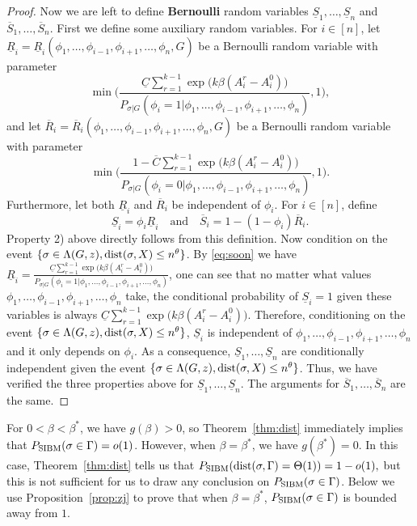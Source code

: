 \documentclass{article}
\begin{document}
\begin{proof}
	Now we are left to define {\bf Bernoulli} random variables $\underline{S}_1,\dots, \underline{S}_n$ and $\overline{S}_1,\dots,\overline{S}_n$.
	First we define some auxiliary random variables.
	For $i\in[n]$, let 
	$\underline{R}_i=\underline{R}_i(\phi_1,\dots,\phi_{i-1},\phi_{i+1},\dots,\phi_n,G)$ be a Bernoulli random variable with parameter 
	$$
	\min \Big( \frac{\underline{C}
		\sum_{r=1}^{k-1}\exp\big(k\beta (A^r_i-A^0_i) \big)}{P_{\sigma|G}(\phi_i=1|\phi_1,\dots,\phi_{i-1},\phi_{i+1},\dots,\phi_n)} , 1 \Big) ,
	$$
	and let 
	$\overline{R}_i=\overline{R}_i(\phi_1,\dots,\phi_{i-1},\phi_{i+1},\dots,\phi_n,G)$ be a Bernoulli random variable with parameter 
	$$
	\min \Big(\frac{1- \overline{C}
		\sum_{r=1}^{k-1}\exp\big(k\beta (A^r_i-A^0_i) \big)}{P_{\sigma|G}(\phi_i=0|\phi_1,\dots,\phi_{i-1},\phi_{i+1},\dots,\phi_n)} , 1 \Big) .
	$$
	Furthermore, let both $\underline{R}_i$ and $\overline{R}_i$ be independent of $\phi_i$.
	For $i\in[n]$, define
	$$
	\underline{S}_i=\phi_i \underline{R}_i \quad
	\text{and} \quad
	\overline{S}_i = 1- (1-\phi_i) \overline{R}_i .
	$$
	Property 2) above directly follows from this definition.
	Now condition on the event $\{\sigma\in \Lambda(G,z) ,\operatorname{dist}(\sigma, X) \le n^{\theta}\}$.
	By \eqref{eq:soon} we have $\underline{R}_i =\frac{\underline{C}
		\sum_{r=1}^{k-1}\exp\big(k\beta (A^r_i-A^0_i) \big)}{P_{\sigma|G}(\phi_i=1|\phi_1,\dots,\phi_{i-1},\phi_{i+1},\dots,\phi_n)} $, one can see that no matter what values $\phi_1,\dots,\phi_{i-1},\phi_{i+1},\dots,\phi_n$ take, the conditional probability of $\underline{S}_i=1$ given these variables is always $\underline{C}
	\sum_{r=1}^{k-1}\exp\big(k\beta (A^r_i-A^0_i) \big)$. Therefore, conditioning on the event $\{\sigma\in \Lambda(G,z) ,\operatorname{dist}(\sigma, X) \le n^{\theta}\}$, $\underline{S}_i$ is independent of $\phi_1,\dots,\phi_{i-1},\phi_{i+1},\dots,\phi_n$ and it only depends on $\phi_i$. As a consequence, $\underline{S}_1,\dots, \underline{S}_n$ are conditionally independent given the event $\{\sigma\in \Lambda(G,z) ,\operatorname{dist}(\sigma, X) \le n^{\theta}\}$. Thus, we have verified the three properties above for $\underline{S}_1,\dots, \underline{S}_n$. The arguments for $\overline{S}_1,\dots, \overline{S}_n$ are the same.
\end{proof}
For $0<\beta<\beta^\ast$, we have $g(\beta)>0$, so Theorem~\ref{thm:dist} immediately implies that $P_{\operatorname{SIBM}}(\sigma \in \Gamma)=o(1)$. However, when $\beta=\beta^\ast$, we have $g(\beta^\ast)=0$. In this case, Theorem~\ref{thm:dist} tells us that
$
P_{\operatorname{SIBM}}(\operatorname{dist}(\sigma,\Gamma) = \Theta(1) ) = 1-o(1) ,
$
but this is not sufficient for us to draw any conclusion on $P_{\operatorname{SIBM}}(\sigma \in \Gamma)$.
Below we use Proposition~\ref{prop:zj} to prove that when $\beta=\beta^\ast$, $P_{\operatorname{SIBM}}(\sigma \in \Gamma)$ is bounded away from $1$.
\end{document}
